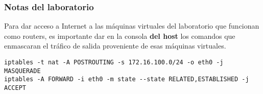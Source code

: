 \subsubsection{Notas del laboratorio}
Para dar acceso a Internet a las máquinas virtuales del laboratorio que funcionan como routers, es importante dar en la consola \textbf{del host} los comandos que enmascaran el tráfico de salida proveniente de esas máquinas virtuales.
\begin{lstlisting}
iptables -t nat -A POSTROUTING -s 172.16.100.0/24 -o eth0 -j MASQUERADE
iptables -A FORWARD -i eth0 -m state --state RELATED,ESTABLISHED -j ACCEPT
\end{lstlisting}

% 
% 
% 
% 
% 
% 
% 
% 
% 
% 	
% 	
% 	
% 
% 
% 
% 
% 
% 
% 
% 
% 
% 
% 
% 
% 
% 
